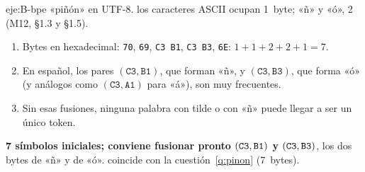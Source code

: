 \begin{solucion}{eje:B-bpe}
\datos «piñón» en UTF-8.
\planteamiento los caracteres ASCII ocupan 1~byte; «ñ» y «ó», 2 (M12, §1.3 y §1.5).
\pasos
\begin{enumerate}[label=\arabic*.]
  \item Bytes en hexadecimal: \texttt{70}, \texttt{69}, \texttt{C3\,B1}, \texttt{C3\,B3}, \texttt{6E}: $1+1+2+2+1=7$.
  \item En español, los pares $(\texttt{C3},\texttt{B1})$, que forman «ñ», y $(\texttt{C3},\texttt{B3})$, que forma «ó» (y análogos como $(\texttt{C3},\texttt{A1})$ para «á»), son muy frecuentes.
  \item Sin esas fusiones, ninguna palabra con tilde o con «ñ» puede llegar a ser un único token.
\end{enumerate}
\resultado \textbf{7 símbolos iniciales; conviene fusionar pronto $(\textmd{\texttt{C3}},\textmd{\texttt{B1}})$ y $(\textmd{\texttt{C3}},\textmd{\texttt{B3}})$}, los dos bytes de «ñ» y de «ó».
\comprobacion coincide con la cuestión~\ref{q:pinon} (7~bytes).

\end{solucion}

